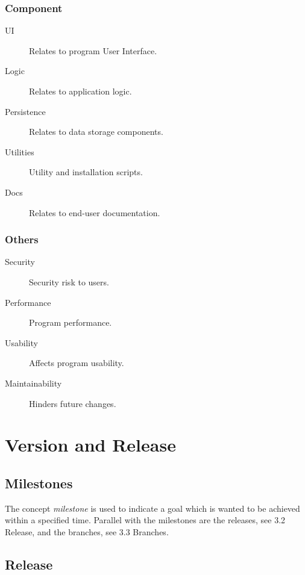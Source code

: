 \documentclass{report}
\begin{document}
\subsection{Component}
\begin{description}
\item[UI]
Relates to program User Interface.
\item[Logic]
Relates to application logic.
\item[Persistence]
Relates to data storage components.
\item[Utilities]
Utility and installation scripts.
\item[Docs]
Relates to end-user documentation.
\end{description}
\subsection{Others}
\begin{description}
\item[Security]
Security risk to users.
\item[Performance]
Program performance.
\item[Usability]
Affects program usability.
\item[Maintainability]
Hinders future changes.
\end{description}

\chapter{Version and Release}
\section{Milestones}
The concept {\it milestone} is used to indicate a goal which is wanted to be achieved within a specified time.
Parallel with the milestones are the releases, see 3.2 Release, and the branches, see 3.3 Branches.
\section{Release}
\end{document}
